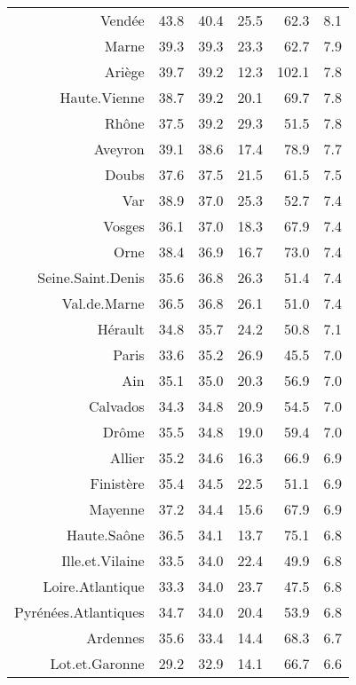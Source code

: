 \documentclass[11pt,a4paper]{article}\usepackage[]{graphicx}\usepackage[]{color}
\begin{document}
\begin{table}[H]
\begin{tabular}{rrrrrr}
  Vendée & 43.8 & 40.4 & 25.5 & 62.3 & 8.1 \\ 
  Marne & 39.3 & 39.3 & 23.3 & 62.7 & 7.9 \\ 
  Ariège & 39.7 & 39.2 & 12.3 & 102.1 & 7.8 \\ 
  Haute.Vienne & 38.7 & 39.2 & 20.1 & 69.7 & 7.8 \\ 
  Rhône & 37.5 & 39.2 & 29.3 & 51.5 & 7.8 \\ 
  Aveyron & 39.1 & 38.6 & 17.4 & 78.9 & 7.7 \\ 
  Doubs & 37.6 & 37.5 & 21.5 & 61.5 & 7.5 \\ 
  Var & 38.9 & 37.0 & 25.3 & 52.7 & 7.4 \\ 
  Vosges & 36.1 & 37.0 & 18.3 & 67.9 & 7.4 \\ 
  Orne & 38.4 & 36.9 & 16.7 & 73.0 & 7.4 \\ 
  Seine.Saint.Denis & 35.6 & 36.8 & 26.3 & 51.4 & 7.4 \\ 
  Val.de.Marne & 36.5 & 36.8 & 26.1 & 51.0 & 7.4 \\ 
  Hérault & 34.8 & 35.7 & 24.2 & 50.8 & 7.1 \\ 
  Paris & 33.6 & 35.2 & 26.9 & 45.5 & 7.0 \\ 
  Ain & 35.1 & 35.0 & 20.3 & 56.9 & 7.0 \\ 
  Calvados & 34.3 & 34.8 & 20.9 & 54.5 & 7.0 \\ 
  Drôme & 35.5 & 34.8 & 19.0 & 59.4 & 7.0 \\ 
  Allier & 35.2 & 34.6 & 16.3 & 66.9 & 6.9 \\ 
  Finistère & 35.4 & 34.5 & 22.5 & 51.1 & 6.9 \\ 
  Mayenne & 37.2 & 34.4 & 15.6 & 67.9 & 6.9 \\ 
  Haute.Saône & 36.5 & 34.1 & 13.7 & 75.1 & 6.8 \\ 
  Ille.et.Vilaine & 33.5 & 34.0 & 22.4 & 49.9 & 6.8 \\ 
  Loire.Atlantique & 33.3 & 34.0 & 23.7 & 47.5 & 6.8 \\ 
  Pyrénées.Atlantiques & 34.7 & 34.0 & 20.4 & 53.9 & 6.8 \\ 
  Ardennes & 35.6 & 33.4 & 14.4 & 68.3 & 6.7 \\ 
  Lot.et.Garonne & 29.2 & 32.9 & 14.1 & 66.7 & 6.6 \\ 
   \hline
\end{tabular}
\end{table}
\end{document}
